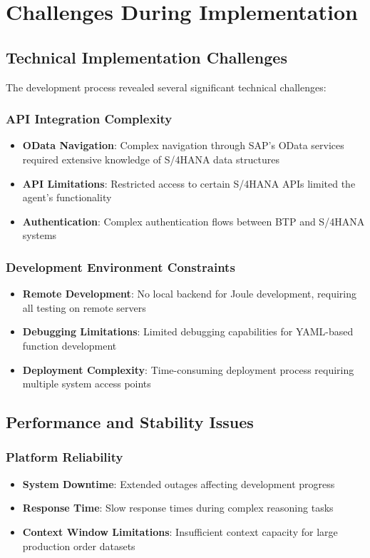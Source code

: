 \section{Challenges During Implementation}

\subsection{Technical Implementation Challenges}

The development process revealed several significant technical challenges:

\subsubsection{API Integration Complexity}
\begin{itemize}
    \item \textbf{OData Navigation}: Complex navigation through SAP's OData services required extensive knowledge of S/4HANA data structures
    \item \textbf{API Limitations}: Restricted access to certain S/4HANA APIs limited the agent's functionality
    \item \textbf{Authentication}: Complex authentication flows between BTP and S/4HANA systems
\end{itemize}

\subsubsection{Development Environment Constraints}
\begin{itemize}
    \item \textbf{Remote Development}: No local backend for Joule development, requiring all testing on remote servers
    \item \textbf{Debugging Limitations}: Limited debugging capabilities for YAML-based function development
    \item \textbf{Deployment Complexity}: Time-consuming deployment process requiring multiple system access points
\end{itemize}

\subsection{Performance and Stability Issues}

\subsubsection{Platform Reliability}
\begin{itemize}
    \item \textbf{System Downtime}: Extended outages affecting development progress
    \item \textbf{Response Time}: Slow response times during complex reasoning tasks
    \item \textbf{Context Window Limitations}: Insufficient context capacity for large production order datasets
\end{itemize}

